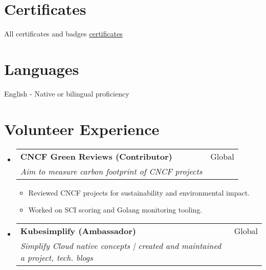 \documentclass[a4paper,20pt]{article}
\makeatletter
\newcommand{\resumeSubheading}[4]{
  \vspace{-1pt}\item
    \begin{tabular*}{0.97\textwidth}{l@{\extracolsep{\fill}}r}
      \textbf{#1} & #2 \\
      \textit{#3} & \textit{#4} \\
    \end{tabular*}\vspace{-5pt}
}
\newcommand{\resumeSubHeadingListStart}{\begin{itemize}[leftmargin=*]}
\newcommand{\resumeSubHeadingListEnd}{\end{itemize}}
\makeatother
\begin{document}
\section{Certificates}
\begin{description}[font=$\bullet$]
\item {All certificates and badges \href{https://dipankar-das.com/posts/aboutme/#certificates-and-badges}{certificates}}

\end{description}

\vspace{-5pt}

\section{Languages}
\begin{description}[font=$\bullet$]
\item {English - Native or bilingual proficiency}

\end{description}

\vspace{-5pt}
\section{Volunteer Experience}
  \resumeSubHeadingListStart
    \resumeSubheading
    {CNCF Green Reviews (Contributor)}{Global}
    {Aim to measure carbon footprint of CNCF projects}{}
    \begin{itemize}[leftmargin=*]
        \item Reviewed CNCF projects for sustainability and environmental impact.
        \item Worked on SCI scoring and Golang monitoring tooling.
    \end{itemize}
    \resumeSubheading
    {Kubesimplify (Ambassador)}{Global}
    {Simplify Cloud native concepts | created and maintained a project, tech. blogs}{}

\resumeSubHeadingListEnd
\end{document}
